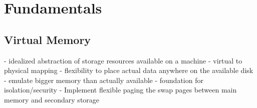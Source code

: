 \chapter{Fundamentals} %
\label{chap:fund}

%

\section{Virtual Memory}

- idealized abstraction of storage resources available on a machine
- virtual to physical mapping
- flexibility to place actual data anywhere on the available disk
- emulate bigger memory than actually available
- foundation for isolation/security
- Implement flexible paging the swap pages between main memory and secondary storage



